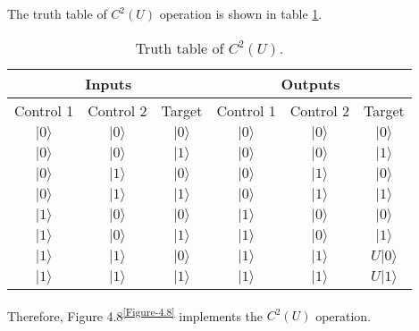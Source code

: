 \documentclass[en]{sol-man}
\begin{document}
\begin{pf}
    The truth table of $C^2(U)$ operation is shown in table \ref{E4.21-C2U-truth-table}.
    \begin{table}[h]
        \centering
        \caption{Truth table of $C^2(U)$.}
        \label{E4.21-C2U-truth-table}
        \begin{tabular}{|c|c|c|c|c|c|}
        \hline
        \multicolumn{3}{|c|}{Inputs} & \multicolumn{3}{c|}{Outputs} \\ \hline
        Control 1 & Control 2 & Target & Control 1 & Control 2 & Target \\ \hline
        $\lvert 0\rangle$ & $\lvert 0\rangle$ & $\lvert 0\rangle$ & $\lvert 0\rangle$ & $\lvert 0\rangle$ & $\lvert 0\rangle$ \\ \hline
        $\lvert 0\rangle$ & $\lvert 0\rangle$ & $\lvert 1\rangle$ & $\lvert 0\rangle$ & $\lvert 0\rangle$ & $\lvert 1\rangle$ \\ \hline
        $\lvert 0\rangle$ & $\lvert 1\rangle$ & $\lvert 0\rangle$ & $\lvert 0\rangle$ & $\lvert 1\rangle$ & $\lvert 0\rangle$ \\ \hline
        $\lvert 0\rangle$ & $\lvert 1\rangle$ & $\lvert 1\rangle$ & $\lvert 0\rangle$ & $\lvert 1\rangle$ & $\lvert 1\rangle$ \\ \hline
        $\lvert 1\rangle$ & $\lvert 0\rangle$ & $\lvert 0\rangle$ & $\lvert 1\rangle$ & $\lvert 0\rangle$ & $\lvert 0\rangle$ \\ \hline
        $\lvert 1\rangle$ & $\lvert 0\rangle$ & $\lvert 1\rangle$ & $\lvert 1\rangle$ & $\lvert 0\rangle$ & $\lvert 1\rangle$ \\ \hline
        $\lvert 1\rangle$ & $\lvert 1\rangle$ & $\lvert 0\rangle$ & $\lvert 1\rangle$ & $\lvert 1\rangle$ & $U\lvert 0\rangle$ \\ \hline
        $\lvert 1\rangle$ & $\lvert 1\rangle$ & $\lvert 1\rangle$ & $\lvert 1\rangle$ & $\lvert 1\rangle$ & $U\lvert 1\rangle$ \\ \hline
        \end{tabular}
    \end{table}

    Therefore, Figure 4.8\textsuperscript{\ref{Figure-4.8}} implements the $C^2(U)$ operation.
\end{pf}
\end{document}

